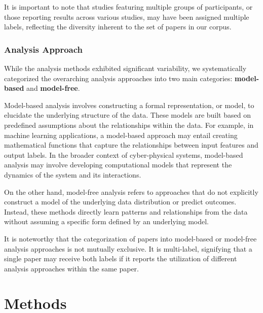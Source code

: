 \documentclass[manuscript,screen,review]{acmart}
\begin{document}
It is important to note that studies featuring multiple groups of participants, or those reporting results across various studies, may have been assigned multiple labels, reflecting the diversity inherent to the set of papers in our corpus.


\subsubsection{Analysis Approach} \label{subsec:analysis_approach}

While the analysis methods exhibited significant variability, we systematically categorized the overarching analysis approaches into two main categories: \textbf{model-based} and \textbf{model-free}.

Model-based analysis involves constructing a formal representation, or model, to elucidate the underlying structure of the data. These models are built based on predefined assumptions about the relationships within the data. For example, in machine learning applications, a model-based approach may entail creating mathematical functions that capture the relationships between input features and output labels. In the broader context of cyber-physical systems, model-based analysis may involve developing computational models that represent the dynamics of the system and its interactions.

On the other hand, model-free analysis refers to approaches that do not explicitly construct a model of the underlying data distribution or predict outcomes. Instead, these methods directly learn patterns and relationships from the data without assuming a specific form defined by an underlying model. 

It is noteworthy that the categorization of papers into model-based or model-free analysis approaches is not mutually exclusive. It is multi-label, signifying that a single paper may receive both labels if it reports the utilization of different analysis approaches within the same paper. 

\section{Methods} \label{sec:methods}

\end{document}
